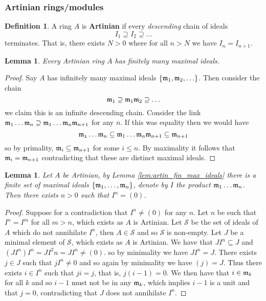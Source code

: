 \documentclass[12pt]{article}
\theoremstyle{plain}
\newtheorem{lemma}[thm]{Lemma}
\theoremstyle{definition}
\newtheorem{defn}[thm]{Definition} %
\newcommand{\call}[1]{\mathcal{#1}}
\begin{document}
	\subsubsection{Artinian rings/modules}
	\begin{defn}
		A ring $A$ is \textbf{Artinian} if every \emph{descending} chain of ideals
		\[I_1 \supseteq I_2 \supseteq \hdots\]
		terminates. That is, there exists $N > 0$ where for all $n > N$ we have $I_n = I_{n+1}$.
	\end{defn}
	\begin{lemma}
		Every Artinian ring $A$ has finitely many maximal ideals.
	\end{lemma}
	\begin{proof}
		\label{lem:artin_fin_max_ideals}
		Say $A$ has infinitely many maximal ideals $\lbrace \frak{m}_1,\frak{m}_2,\hdots\rbrace$. Then consider the chain
		\[\frak{m}_1 \supseteq \frak{m}_1\frak{m}_2 \supseteq \hdots\]
		we claim this is an infinite descending chain. Consider the link $\frak{m}_1\hdots \frak{m}_n \supseteq \frak{m}_1\hdots \frak{m}_n\frak{m}_{n+1}$ for any $n$. If this was equality then we would have
		\[\frak{m_1}\hdots \frak{m}_n \subseteq \frak{m}_1\hdots\frak{m}_n\frak{m}_{n+1} \subseteq \frak{m}_{n+1}\]
		so by primality, $\frak{m}_i \subseteq \frak{m}_{n+1}$ for some $i \leq n$. By maximality it follows that $\frak{m}_i = \frak{m}_{n+1}$ contradicting that these are distinct maximal ideals.
	\end{proof}
	\begin{lemma}
		Let $A$ be Artinian, by Lemma \ref{lem:artin_fin_max_ideals} there is a finite set of maximal ideals $\lbrace \frak{m}_1,\hdots,\frak{m}_n\rbrace$, denote by $I$ the product $\frak{m}_1\hdots\frak{m}_n$. Then there exists $n > 0$ such that $I^n = (0)$.
	\end{lemma}
	\begin{proof}
		Suppose for a contradiction that $I^n \neq (0)$ for any $n$. Let $n$ be such that $I^n = I^{m}$ for all $m > n$, which exists as $A$ is Artinian. Let $\call{S}$ be the set of ideals of $A$ which do not annihilate $I^n$, then $A \in \call{S}$ and so $\call{S}$ is non-empty. Let $J$ be a minimal element of $\call{S}$, which exists as $A$ is Artinian. We have that $JI^n \subseteq J$ and $(JI^n)I^n = JI^2n = JI^n \neq (0)$. so by minimality we have $JI^n = J$. There exists $j \in J$ such that $jI^n \neq 0$ and so again by minimality we have $(j) = J$. Thus there exists $i \in I^n$ such that $ji = j$, that is, $j(i - 1) = 0$. We then have that $i \in \frak{m}_k$ for all $k$ and so $i - 1$ must not be in any $\frak{m}_k$, which implies $i - 1$ is a unit and that $j = 0$, contradicting that $J$ does not annihilate $I^n$.
	\end{proof}
\end{document}
